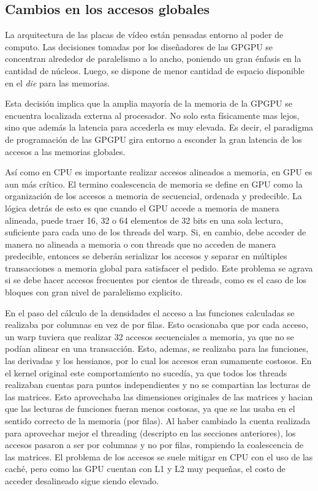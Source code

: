 \subsection{Cambios en los accesos globales}
\label{GuardarFunctionsGPU}
La arquitectura de las placas de v\'ideo est\'an pensadas entorno al poder de computo.
Las decisiones tomadas por los dise\~nadores de las GPGPU se concentran alrededor
de paralelismo a lo ancho, poniendo un gran \'enfasis en la cantidad de n\'ucleos. Luego,
se dispone de menor cantidad de espacio disponible en el \textit{die} para las memorias.

Esta decisi\'on implica que la amplia mayor\'ia de la memoria de la GPGPU se encuentra
localizada externa al procesador.  No solo esta f\'isicamente mas lejos, sino que
adem\'as la latencia para accederla es muy elevada. Es decir, el paradigma de
programaci\'on de las GPGPU gira entorno a esconder la gran latencia de los accesos
a las memorias globales.

As\'i como en CPU es importante realizar accesos alineados a memoria, en GPU es aun m\'as cr\'itico.
El termino coalescencia de memoria se define en GPU como la organizaci\'on de los accesos a memoria de secuencial, ordenada y predecible.
La l\'ogica detr\'as de esto es que cuando el GPU accede a memoria de manera alineada, puede traer
16, 32 o 64 elementos de 32 bits en una sola lectura\cite{cudaProgrammingGuide}, suficiente para
cada uno de los threads del warp. Si, en cambio, debe acceder de manera no
alineada a memoria o con threads que no acceden de manera predecible, entonces
se deber\'an serializar los accesos y separar en m\'ultiples transacciones a memoria global para satisfacer
el pedido. Este problema se agrava si se debe hacer accesos frecuentes
por cientos de threads, como es el caso de los bloques con gran nivel de paralelismo explicito.

En el paso del c\'alculo de la densidades el acceso a las funciones calculadas
se realizaba por columnas en vez de por filas. Esto ocasionaba que por cada acceso,
un warp tuviera que realizar 32 accesos secuenciales a memoria, ya que no se pod\'ian alinear
en una transacci\'on. Esto, ademas, se realizaba para las funciones, las derivadas y los
hessianos, por lo cual los accesos eran sumamente costosos. En el kernel original este comportamiento
no suced\'ia, ya que todos los threads realizaban cuentas para puntos independientes y no se compartian las
lecturas de las matrices. Esto aprovechaba las dimensiones originales de las matrices y hacian que las lecturas de
funciones fueran menos costosas, ya que se las usaba en el sentido correcto de la memoria (por filas).
Al haber cambiado la cuenta realizada para aprovechar mejor el threading (descripto en las secciones anteriores),
los accesos pasaron a ser por columnas y no por filas, rompiendo la coalescencia de las matrices. El
problema de los accesos se suele mitigar en CPU con el uso de las cach\'e, pero como las GPU cuentan
con L1 y L2 muy peque\~nas, el costo de acceder desalineado sigue siendo elevado.

